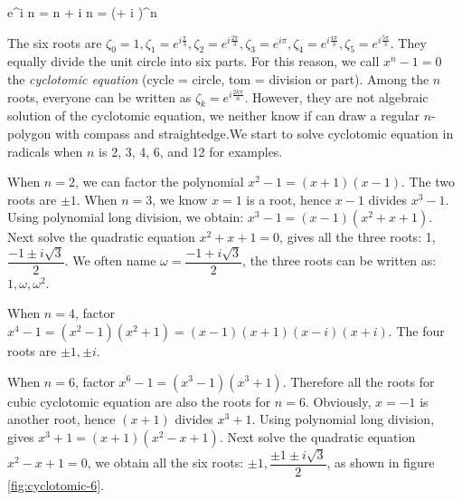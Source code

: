 \documentclass[b5paper]{article}
\begin{document}
\be
e^{i n \theta} = \cos n \theta + i \sin n \theta = (\cos \theta + i \sin \theta)^n
\ee

The six roots are $\zeta_0 = 1, \zeta_1 = e^{i\frac{\pi}{3}}, \zeta_2 = e^{i\frac{2\pi}{3}}, \zeta_3 = e^{i\pi}, \zeta_4 = e^{i\frac{4\pi}{3}}, \zeta_5 = e^{i\frac{5\pi}{3}}$. They equally divide the unit circle into six parts. For this reason, we call $x^n - 1 = 0$ the {\em cyclotomic equation} (cycle = circle, tom = division or part). Among the $n$ roots, everyone can be written as $\zeta_k = e^{i\frac{2k\pi}{n}}$. However, they are not algebraic solution of the cyclotomic equation, we neither know if can draw a regular $n$-polygon with compass and straightedge.We start to solve cyclotomic equation in radicals when $n$ is 2, 3, 4, 6, and 12 for examples.

When $n = 2$, we can factor the polynomial $x^2 - 1 = (x + 1)(x - 1)$. The two roots are $\pm 1$. When $n=3$, we know $x = 1$ is a root, hence $x - 1$ divides $x^3 - 1$. Using polynomial long division, we obtain: $x^3 - 1 = (x - 1)(x^2 + x + 1)$. Next solve the quadratic equation $x^2 + x + 1 = 0$, gives all the three roots: 1, $\dfrac{-1 \pm i \sqrt{3}}{2}$. We often name $\omega = \dfrac{-1 + i \sqrt{3}}{2}$, the three roots can be written as: $1, \omega, \omega^2$.

\begin{center}
\end{center}

When $n = 4$, factor $x^4 - 1 = (x^2 - 1)(x^2 + 1) = (x - 1)(x + 1)(x - i)(x + i)$. The four roots are $\pm 1, \pm i$.



When $n = 6$, factor $x^6 - 1 = (x^3 - 1)(x^3 + 1)$. Therefore all the roots for cubic cyclotomic equation are also the roots for $n = 6$. Obviously, $x = -1$ is another root, hence $(x + 1)$ divides $x^3 + 1$. Using polynomial long division, gives $x^3 + 1 = (x + 1)(x^2 - x + 1)$. Next solve the quadratic equation $x^2 - x + 1 = 0$, we obtain all the six roots: $\pm 1, \dfrac{\pm 1 \pm i \sqrt{3}}{2}$, as shown in figure \ref{fig:cyclotomic-6}.
\end{document}

